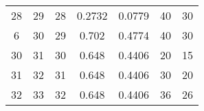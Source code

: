 \begin{table}
\begin{adjustbox}{width=1.2\textwidth,center=\textwidth}
\begin{tabular}{ccccccc}
28                                                        & 29                                                          & 28                                                  & 0.2732                                                                     & 0.0779                                                                    & 40                                                                          & 30                                                                               \\
6                                                         & 30                                                          & 29                                                  & 0.702                                                                      & 0.4774                                                                    & 40                                                                          & 30                                                                               \\
30                                                        & 31                                                          & 30                                                  & 0.648                                                                      & 0.4406                                                                    & 20                                                                          & 15                                                                               \\
31                                                        & 32                                                          & 31                                                  & 0.648                                                                      & 0.4406                                                                    & 30                                                                          & 20                                                                               \\
32                                                        & 33                                                          & 32                                                  & 0.648                                                                      & 0.4406                                                                    & 36                                                                          & 26                                                                               \\

\end{tabular}
\end{adjustbox}
\end{table}
